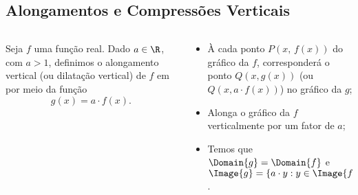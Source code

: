 \subsection{Alongamentos e Compressões Verticais}
\begin{frame}
  \begin{columns}[onlytextwidth]
    \begin{column}{0.49\textwidth}\vspace*{-0.5cm}
      \begin{definition}
        Seja $f$ uma função real. Dado $a\in\R$, com $a>1$, definimos o alongamento vertical (ou dilatação vertical) de $f$ em por meio da função
        \begin{equation*}
          g(x) = a\cdot f(x).
        \end{equation*}
      \end{definition}
    \end{column}
    \begin{column}{0.49\textwidth}\vspace*{-0.6cm}
      \begin{itemize}
        \item À cada ponto $P(x,\,f(x))$ do gráfico da $f$, corresponderá o ponto $Q(x,g(x))$ (ou $Q(x,a\cdot f(x))$) no gráfico da $g$;
        \item Alonga o gráfico da $f$ verticalmente por um fator de $a$;
        \item Temos que $\Domain{g} = \Domain{f}$ e $\Image{g}=\{a\cdot y:y\in\Image{f}\}$.
      \end{itemize}
    \end{column}
  \end{columns}
  \begin{figure}
  \end{figure}
\end{frame}

